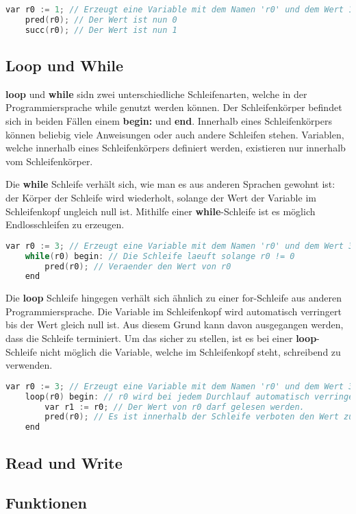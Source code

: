 \begin{lstlisting}[language=c, caption=pred und succ in While, label={lst:while-var-defdec}]
	var r0 := 1; // Erzeugt eine Variable mit dem Namen 'r0' und dem Wert 1
	pred(r0); // Der Wert ist nun 0
	succ(r0); // Der Wert ist nun 1
\end{lstlisting}

\subsection{Loop und While}
\textbf{loop} und \textbf{while} sidn zwei unterschiedliche Schleifenarten, welche in der Programmiersprache while genutzt werden können. Der Schleifenkörper befindet sich in beiden Fällen einem \textbf{begin:} und \textbf{end}. Innerhalb eines Schleifenkörpers können beliebig viele Anweisungen oder auch andere Schleifen stehen. Variablen, welche innerhalb eines Schleifenkörpers definiert werden, existieren nur innerhalb vom Schleifenkörper.

Die \textbf{while} Schleife verhält sich, wie man es aus anderen Sprachen gewohnt ist: der Körper der Schleife wird wiederholt, solange der Wert der Variable im Schleifenkopf ungleich null ist. Mithilfe einer \textbf{while}-Schleife ist es möglich Endlosschleifen zu erzeugen.

\begin{lstlisting}[language=c, caption=while-Schleife in While, label={lst:while-var-defdec}]
	var r0 := 3; // Erzeugt eine Variable mit dem Namen 'r0' und dem Wert 3
	while(r0) begin: // Die Schleife laeuft solange r0 != 0
		pred(r0); // Veraender den Wert von r0
	end
\end{lstlisting}

Die \textbf{loop} Schleife hingegen verhält sich ähnlich zu einer for-Schleife aus anderen Programmiersprache. Die Variable im Schleifenkopf wird automatisch verringert bis der Wert gleich null ist. Aus diesem Grund kann davon ausgegangen werden, dass die Schleife terminiert. Um das sicher zu stellen, ist es bei einer \textbf{loop}-Schleife nicht möglich die Variable, welche im Schleifenkopf steht, schreibend zu verwenden. 

\begin{lstlisting}[language=c, caption=loop-Schleife in While, label={lst:while-var-defdec}]
	var r0 := 3; // Erzeugt eine Variable mit dem Namen 'r0' und dem Wert 3
	loop(r0) begin: // r0 wird bei jedem Durchlauf automatisch verringert
		var r1 := r0; // Der Wert von r0 darf gelesen werden.
		pred(r0); // Es ist innerhalb der Schleife verboten den Wert zu aendern!
	end
\end{lstlisting}

\subsection{Read und Write}


\subsection{Funktionen}